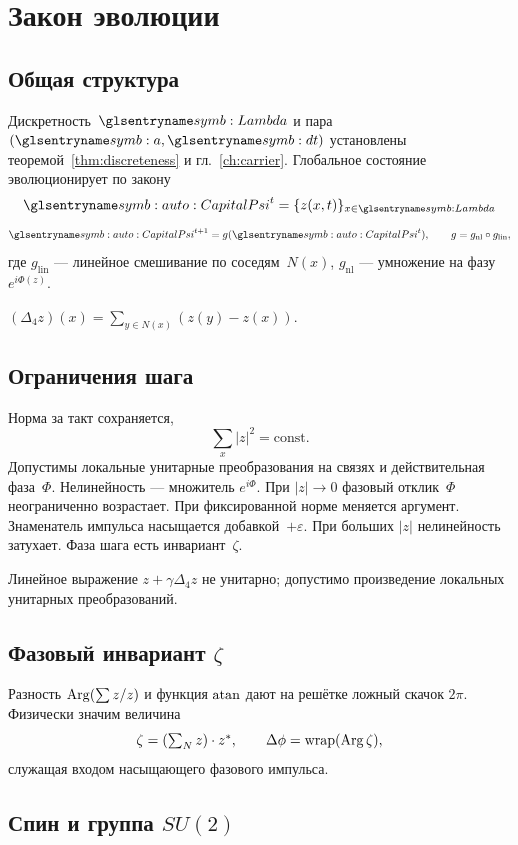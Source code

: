 \chapter{Закон эволюции}
\label{ch:evolution}

\section{Общая структура}

Дискретность~$\carrierLattice$ и пара $(\caStepSpace,\htick)$ установлены теоремой~\ref{thm:discreteness}
и гл.~\ref{ch:carrier}.
Глобальное состояние эволюционирует по закону
\[
\symCapitalPsi^t=\{z(x,t)\}_{x\in\carrierLattice}
\]
\[
  \symCapitalPsi^{t+1}=g(\symCapitalPsi^t),\qquad g=g_{\mathrm{nl}}\circ g_{\mathrm{lin}},
\]
где $g_{\mathrm{lin}}$ --- линейное смешивание по соседям~$N(x)$,
$g_{\mathrm{nl}}$ --- умножение на фазу $e^{i\Phi(z)}$.

\begin{definition}
$(\Delta_4 z)(x)=\sum_{y\in N(x)}(z(y)-z(x))$.
\end{definition}

\section{Ограничения шага}

Норма за такт сохраняется,
\[
  \sum_x|z|^2=\mathrm{const}.
\]
Допустимы локальные унитарные преобразования на связях и действительная фаза~$\Phi$.
Нелинейность --- множитель $e^{i\Phi}$.
При $|z|\to 0$ фазовый отклик~$\Phi$ неограниченно возрастает.
При фиксированной норме меняется аргумент.
Знаменатель импульса насыщается добавкой~$+\varepsilon$.
При больших $|z|$ нелинейность затухает.
Фаза шага есть инвариант~$\zeta$.

Линейное выражение $z+\gamma\Delta_4 z$ не унитарно;
допустимо произведение локальных унитарных преобразований.

\section{Фазовый инвариант \texorpdfstring{$\zeta$}{zeta}}

Разность $\operatorname{Arg}(\sum z/z)$ и функция $\operatorname{atan}$ дают на решётке ложный скачок $2\pi$.
Физически значим величина
\[
  \zeta=(\textstyle\sum_N z)\cdot z^*,\qquad \Delta\phi=\operatorname{wrap}(\operatorname{Arg}\zeta),
\]
служащая входом насыщающего фазового импульса.

\section{Спин и группа \texorpdfstring{$SU(2)$}{SU(2)}}

